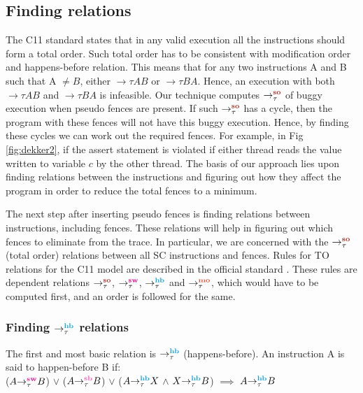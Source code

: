 \subsection{Finding relations}
The C11 standard \cite{C11} states that in any valid execution 
all the \mosc instructions should form a total order. Such total order
has to be consistent with modification order and 
happens-before relation. This means that for any two \mosc instructions A 
and B such that A $ \neq B $, either $\to{\tau}{A}{B}$ or $\to{\tau}{B}{A}$. 
Hence, an execution with both $\to{\tau}{A}{B}$ and $\to{\tau}{B}{A}$ is infeasible.
Our technique computes $\setSO$ of buggy execution when pseudo fences are 
present. If such $\setSO$ has a cycle, then the program with these fences 
will not have this buggy execution. 
Hence, by finding these cycles we can work out the required fences.
For example, in Fig \ref{fig:dekker2}, if the assert statement is violated
if either thread reads the value written to variable $c$ by the other thread.
The basis of our approach lies upon finding relations between the 
instructions and figuring out how they affect the program in order to 
reduce the total fences to a minimum. 

\par
The next step after inserting pseudo fences is finding relations between 
instructions, including fences. 
These relations will help in figuring out which fences to eliminate from 
the trace. In particular, we are concerned with the $\setSO$ (total order) 
relations between all SC instructions and fences. Rules for TO relations 
for the C11 model are described in the official standard \cite{C11}. 
These rules are dependent relations $\setSO $, $\setSW$, $\setHB$ and $\setMO$, which 
would have to be computed first, and an order is followed for the same.

\subsubsection{Finding $\setHB$ relations}
The first and most basic relation is $\setHB$ (happens-before). 
An instruction A is said to happen-before B if:\\
($\sw{\tau}{A}{B}$) $\lor$ ($\seqb{\tau}{A}{B}$) $\lor$ ($\hb{\tau}{A}{X}$ $\land$ $\hb{\tau}{X}{B}$) $\implies$ $\hb{\tau}{A}{B}$

